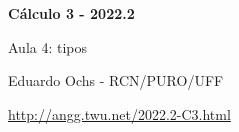 \documentclass[oneside,12pt]{article}
\begin{document}


\def\u#1{\par{\footnotesize \url{#1}}}

\def\drafturl{http://angg.twu.net/LATEX/2022-2-C3.pdf}
\def\drafturl{http://angg.twu.net/2022.2-C3.html}
\def\draftfooter{\tiny \href{\drafturl}{\jobname{}} \ColorBrown{\shorttoday{} \hours}}

\def\rq{\ColorRed{?}}
\def\undq#1{\underbrace{#1}_{\rq}}

\def\co#1{{%
  \def\"{\char34}%
  \def\%{\char37}%
  \def\\{\char92}%
  \def\^{\char94}%
  \def\~{\char126}%
  \tt#1%
  }}
\def\qco#1{`\co{#1}'}
\def\qqco#1{``\co{#1}''}



%

\thispagestyle{empty}

\begin{center}

\vspace*{1.2cm}

{\bf \Large Cálculo 3 - 2022.2}

\bsk

Aula 4: tipos

\bsk

Eduardo Ochs - RCN/PURO/UFF

\url{http://angg.twu.net/2022.2-C3.html}

\end{center}
\end{document}
